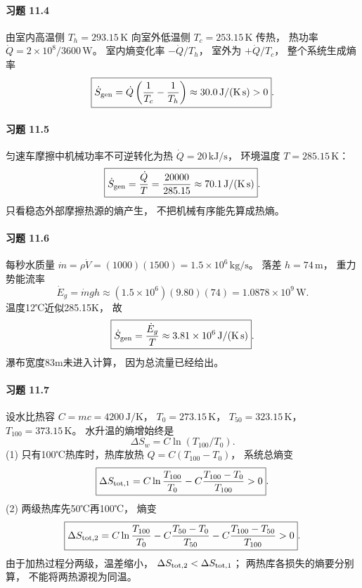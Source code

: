 \paragraph{习题 11.4}
由室内高温侧
\(T_h=293.15\,\mathrm K\)
向室外低温侧
\(T_c=253.15\,\mathrm K\) 传热，
热功率
\(\dot Q=2\times10^8/3600\,\mathrm W\)。
室内熵变化率 \(-\dot Q/T_h\)，
室外为 \(+\dot Q/T_c\)，
整个系统生成熵率
\[
 \boxed{\dot S_{\rm gen}=\dot Q
 \left(\frac1{T_c}-\frac1{T_h}\right)
 \approx30.0\,\mathrm{J/(K\,s)}>0}.
\]

\paragraph{习题 11.5}
匀速车摩擦中机械功率不可逆转化为热
\(\dot Q=20\,\mathrm{kJ/s}\)，
环境温度 \(T=285.15\,\mathrm K\)：
\[
 \boxed{\dot S_{\rm gen}=\frac{\dot Q}{T}
 =\frac{20000}{285.15}
 \approx70.1\,\mathrm{J/(K\,s)}}.
\]
只看稳态外部摩擦热源的熵产生，
不把机械有序能先算成热熵。

\paragraph{习题 11.6}
每秒水质量
\(\dot m=\rho\dot V
 =(1000)(1500)=1.5\times10^6\,\mathrm{kg/s}\)。
落差 \(h=74\,\mathrm m\)，
重力势能流率
\[
 \dot E_g=\dot m gh
 \approx(1.5\times10^6)(9.80)(74)
 =1.0878\times10^9\,\mathrm W.
\]
温度12℃近似285.15K，
故
\[
 \boxed{\dot S_{\rm gen}=\frac{\dot E_g}{T}
 \approx3.81\times10^6\,\mathrm{J/(K\,s)}}.
\]
瀑布宽度83m未进入计算，
因为总流量已经给出。

\paragraph{习题 11.7}
设水比热容
\(C=mc=4200\,\mathrm{J/K}\)，
\(T_0=273.15\,\mathrm K\)，
\(T_{50}=323.15\,\mathrm K\)，
\(T_{100}=373.15\,\mathrm K\)。
水升温的熵增始终是
\[
 \Delta S_w=C\ln(T_{100}/T_0).
\]
(1) 只有100℃热库时，热库放热
\(Q=C(T_{100}-T_0)\)，
系统总熵变
\[
 \boxed{\Delta S_{\rm tot,1}
 =C\ln\frac{T_{100}}{T_0}
 -C\frac{T_{100}-T_0}{T_{100}}>0}.
\]
(2) 两级热库先50℃再100℃，
熵变
\[
 \boxed{\Delta S_{\rm tot,2}
 =C\ln\frac{T_{100}}{T_0}
 -C\frac{T_{50}-T_0}{T_{50}}
 -C\frac{T_{100}-T_{50}}{T_{100}}>0}.
\]
由于加热过程分两级，温差缩小，
\(\Delta S_{\rm tot,2}<\Delta S_{\rm tot,1}\)；
两热库各损失的熵要分别算，
不能将两热源视为同温。

